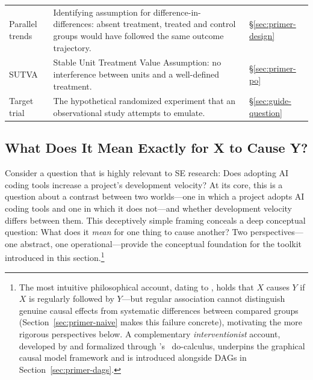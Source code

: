 \begin{table}[t]
\begin{tabularx}{\linewidth}{@{} p{3.0cm} X p{1.5cm} @{}}
Parallel trends & Identifying assumption for difference-in-differences: absent treatment, treated and control groups would have followed the same outcome trajectory. & \S\ref{sec:primer-design} \\
SUTVA & Stable Unit Treatment Value Assumption: no interference between units and a well-defined treatment. & \S\ref{sec:primer-po} \\
Target trial & The hypothetical randomized experiment that an observational study attempts to emulate. & \S\ref{sec:guide-question} \\
\bottomrule
\end{tabularx}
\end{table}

\subsection{What Does It Mean Exactly for X to Cause Y?}
\label{sec:primer-causality}

Consider a question that is highly relevant to SE research: Does adopting AI coding tools increase a project's development velocity?
At its core, this is a question about a contrast between two worlds---one in which a project adopts AI coding tools and one in which it does not---and whether development velocity differs between them.
This deceptively simple framing conceals a deep conceptual question: What does it \emph{mean} for one thing to cause another?
Two perspectives---one abstract, one operational---provide the conceptual foundation for the toolkit introduced in this section.\footnote{The most intuitive philosophical account, dating to \citet{hume1748enquiry}, holds that $X$ causes $Y$ if $X$ is regularly followed by $Y$---but regular association cannot distinguish genuine causal effects from systematic differences between compared groups (Section~\ref{sec:primer-naive} makes this failure concrete), motivating the more rigorous perspectives below.
A complementary \emph{interventionist} account, developed by \citet{woodward2003making} and formalized through \citeauthor{pearl2009causality}'s~\cite{pearl2009causality} do-calculus, underpins the graphical causal model framework and is introduced alongside DAGs in Section~\ref{sec:primer-dags}.}

